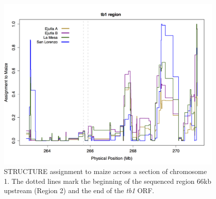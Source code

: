 \documentclass[11pt]{article} %
\begin{document}
\begin{linenumbers}
\begin{flushleft}
\begin{figure}[!t]
  \begin{center}
   \includegraphics[width=160mm]{Fig3Structure.png}
     \end{center}
    \caption{STRUCTURE assignment to maize across a section of chromosome 1. The dotted lines mark the beginning of the sequenced region 66kb upstream (Region 2) and the end of the \emph{tb1} ORF.}
\label{Fig3Structure}
\end{figure}
\clearpage


\end{flushleft}
\end{linenumbers}
\end{document}
